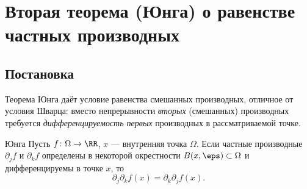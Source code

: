 
\section{Вторая теорема (Юнга) о равенстве частных производных}

\subsection*{Постановка}

Теорема Юнга даёт условие равенства смешанных производных, отличное от условия
Шварца: вместо непрерывности \emph{вторых} (смешанных) производных требуется
\emph{дифференцируемость первых} производных в рассматриваемой точке. 

\begin{Theorem}{Юнга}{}
	Пусть $f\colon\Omega\to\RR$, $x$ --- внутренняя точка $\Omega$. Если частные
	производные $\partial_j f$ и $\partial_k f$ определены в некоторой окрестности
	$B(x,\eps)\subset\Omega$ и дифференцируемы в точке $x$, то
	\[
	\partial_j\partial_k f(x)=\partial_k\partial_j f(x).
	\]
\end{Theorem}

